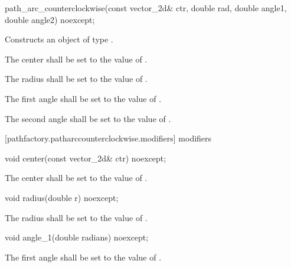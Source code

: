 \begin{itemdecl}
    path_arc_counterclockwise(const vector_2d& ctr, double rad, double angle1,
      double angle2) noexcept;
\end{itemdecl}
\begin{itemdescr}
	\pnum
	\effects
	Constructs an object of type .
	
	\pnum
	The center shall be set to the value of .
	
	\pnum
	The radius shall be set to the value of .
	
	\pnum
	The first angle shall be set to the value of .

	\pnum
	The second angle shall be set to the value of .
\end{itemdescr}

 [pathfactory.patharccounterclockwise.modifiers]{ modifiers}

\begin{itemdecl}
    void center(const vector_2d& ctr) noexcept;
\end{itemdecl}
\begin{itemdescr}
	\pnum
	\effects
	The center shall be set to the value of .
\end{itemdescr}

\begin{itemdecl}
    void radius(double r) noexcept;
\end{itemdecl}
\begin{itemdescr}
	\pnum
	\effects
	The radius shall be set to the value of .
\end{itemdescr}

\begin{itemdecl}
    void angle_1(double radians) noexcept;
\end{itemdecl}
\begin{itemdescr}
	\pnum
	\effects
	The first angle shall be set to the value of .
\end{itemdescr}

